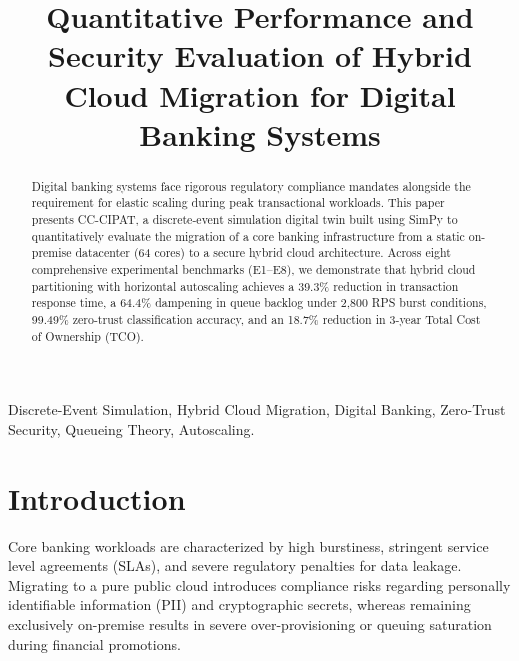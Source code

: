 \documentclass[conference]{IEEEtran}
\begin{document}
\title{Quantitative Performance and Security Evaluation of Hybrid Cloud Migration for Digital Banking Systems}

\author{
}

\maketitle

\begin{abstract}
Digital banking systems face rigorous regulatory compliance mandates alongside the requirement for elastic scaling during peak transactional workloads. This paper presents CC-CIPAT, a discrete-event simulation digital twin built using SimPy to quantitatively evaluate the migration of a core banking infrastructure from a static on-premise datacenter (64 cores) to a secure hybrid cloud architecture. Across eight comprehensive experimental benchmarks (E1--E8), we demonstrate that hybrid cloud partitioning with horizontal autoscaling achieves a 39.3\% reduction in transaction response time, a 64.4\% dampening in queue backlog under 2,800 RPS burst conditions, 99.49\% zero-trust classification accuracy, and an 18.7\% reduction in 3-year Total Cost of Ownership (TCO).
\end{abstract}

\begin{IEEEkeywords}
Discrete-Event Simulation, Hybrid Cloud Migration, Digital Banking, Zero-Trust Security, Queueing Theory, Autoscaling.
\end{IEEEkeywords}

\section{Introduction}
Core banking workloads are characterized by high burstiness, stringent service level agreements (SLAs), and severe regulatory penalties for data leakage. Migrating to a pure public cloud introduces compliance risks regarding personally identifiable information (PII) and cryptographic secrets, whereas remaining exclusively on-premise results in severe over-provisioning or queuing saturation during financial promotions.
\end{document}
